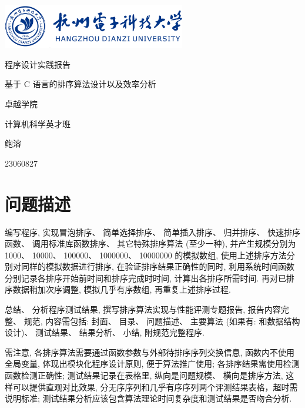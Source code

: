 \documentclass[12pt]{article}
\begin{document}
\begin{titlepage}


\parbox[c]{8cm}{
    \includegraphics[width=8cm]{assets/hdu.png}
}

\setlength{\parindent}{0pt}
\centering
\vfill
{ \heiti \textcolor{xblue}{程序设计实践报告}\par}
\vspace{10pt}
{ \heiti 基于 C 语言的排序算法设计以及效率分析\par}
\vfill
{\large \heiti 卓越学院\par
计算机科学英才班\par
鲍溶\par
23060827\par
}
\vfill
\restoregeometry

\end{titlepage}

\renewcommand\contentsname{\textcolor{xblue}{目录}}
    \tableofcontents
\clearpage
\setcounter{page}{1}

\section{问题描述}

编写程序, 实现冒泡排序、 简单选择排序、 简单插入排序、 归并排序、 快速排序函数、 调用标准库函数排序、 其它特殊排序算法 (至少一种), 并产生规模分别为 1000、 10000、 100000、 1000000、 10000000 的模拟数组, 使用上述排序方法分别对同样的模拟数据进行排序, 在验证排序结果正确性的同时, 利用系统时间函数分别记录各排序开始前时间和排序完成时时间, 计算出各排序所需时间. 再对已排序数据稍加次序调整, 模拟几乎有序数组, 再重复上述排序过程.

总结、 分析程序测试结果, 撰写排序算法实现与性能评测专题报告, 报告内容完整、 规范, 内容需包括: 封面、 目录、 问题描述、 主要算法 (如果有: 和数据结构设计)、 测试结果、 结果分析、 小结, 附规范完整程序.

需注意, 各排序算法需要通过函数参数与外部待排序序列交换信息, 函数内不使用全局变量, 体现出模块化程序设计原则, 便于算法推广使用; 各排序结果需使用检测函数检测正确性; 测试结果记录在表格里, 纵向是问题规模、 横向是排序方法, 这样可以提供直观对比效果, 分无序序列和几乎有序序列两个评测结果表格，超时需说明标准; 测试结果分析应该包含算法理论时间复杂度和测试结果是否吻合分析.
\end{document}
